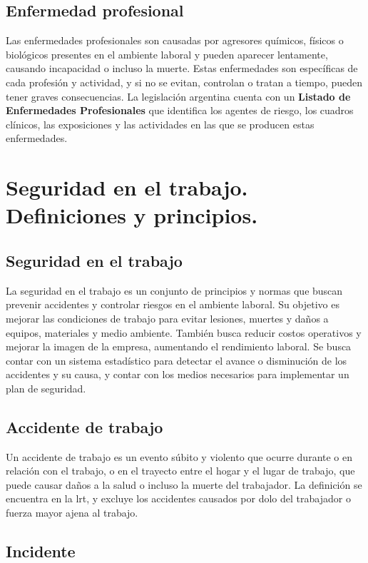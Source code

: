 \subsection{Enfermedad profesional}

Las enfermedades profesionales son causadas por agresores químicos, físicos o
biológicos presentes en el ambiente laboral y pueden aparecer lentamente,
causando incapacidad o incluso la muerte. Estas enfermedades son específicas de
cada profesión y actividad, y si no se evitan, controlan o tratan a tiempo,
pueden tener graves consecuencias. La legislación argentina cuenta con un
\textbf{Listado de Enfermedades Profesionales} que identifica los agentes de
riesgo, los cuadros clínicos, las exposiciones y las actividades en las que se
producen estas enfermedades.

\section{Seguridad en el trabajo. Definiciones y principios.}

\subsection{Seguridad en el trabajo}

La seguridad en el trabajo es un conjunto de principios y normas que buscan
prevenir accidentes y controlar riesgos en el ambiente laboral. Su objetivo es
mejorar las condiciones de trabajo para evitar lesiones, muertes y daños a
equipos, materiales y medio ambiente. También busca reducir costos operativos y
mejorar la imagen de la empresa, aumentando el rendimiento laboral. Se busca
contar con un sistema estadístico para detectar el avance o disminución de los
accidentes y su causa, y contar con los medios necesarios para implementar un
plan de seguridad.

\subsection{Accidente de trabajo}

Un accidente de trabajo es un evento súbito y violento que ocurre durante o en
relación con el trabajo, o en el trayecto entre el hogar y el lugar de trabajo,
que puede causar daños a la salud o incluso la muerte del trabajador. La
definición se encuentra en la \acrfull{lrt}, y excluye los accidentes causados
por dolo del trabajador o fuerza mayor ajena al trabajo.

\subsection{Incidente}

